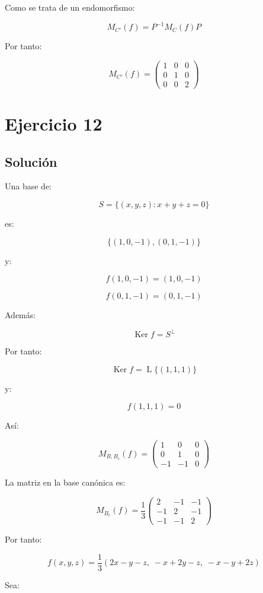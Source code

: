 \documentclass[11pt,a4paper]{article}
\newcommand{\Ker}{\operatorname{Ker}}
\newcommand{\Span}{\operatorname{L}}
\begin{document}
	Como se trata de un endomorfismo:

	\[
	M_{C'}(f)
	=
	P^{-1}M_C(f)P
	\]

	Por tanto:

	\[
	\boxed{
	M_{C'}(f)
	=
	\begin{pmatrix}
	1&0&0\\
	0&1&0\\
	0&0&2
	\end{pmatrix}
	}
	\]

\section{Ejercicio 12}
	\subsection{Solución}

	Una base de:

	\[
	S=
	\{(x,y,z):x+y+z=0\}
	\]

	es:

	\[
	\{(1,0,-1),(0,1,-1)\}
	\]

	y:

	\[
	f(1,0,-1)=(1,0,-1)
	\]

	\[
	f(0,1,-1)=(0,1,-1)
	\]

	Además:

	\[
	\Ker f=S^\perp
	\]

	Por tanto:

	\[
	\Ker f
	=
	\Span\{(1,1,1)\}
	\]

	y:

	\[
	f(1,1,1)=0
	\]

	Así:

	\[
	\boxed{
	M_{B,B_c}(f)
	=
	\begin{pmatrix}
	1&0&0\\
	0&1&0\\
	-1&-1&0
	\end{pmatrix}
	}
	\]

	La matriz en la base canónica es:

	\[
	\boxed{
	M_{B_c}(f)
	=
	\frac13
	\begin{pmatrix}
	2&-1&-1\\
	-1&2&-1\\
	-1&-1&2
	\end{pmatrix}
	}
	\]

	Por tanto:

	\[
	\boxed{
	f(x,y,z)
	=
	\frac13
	(2x-y-z,\;-x+2y-z,\;-x-y+2z)
	}
	\]

	Sea:
\end{document}
